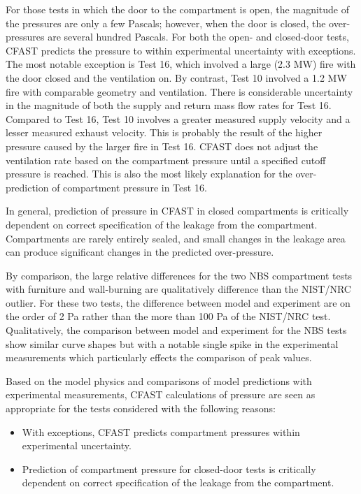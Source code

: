 For those tests in which the door to the compartment is open, the magnitude of the pressures are only a few Pascals; however, when the door is closed, the over-pressures are several hundred Pascals.  For both the open- and closed-door tests, CFAST predicts the pressure to within experimental uncertainty with exceptions.  The most notable exception is Test 16, which involved a large (2.3 MW) fire with the door closed and the ventilation on.  By contrast, Test 10 involved a 1.2 MW fire with comparable geometry and ventilation.  There is considerable uncertainty in the magnitude of both the supply and return mass flow rates for Test 16.  Compared to Test 16, Test 10 involves a greater measured supply velocity and a lesser measured exhaust velocity.  This is probably the result of the higher pressure caused by the larger fire in Test 16.  CFAST does not adjust the ventilation rate based on the compartment pressure until a specified cutoff pressure is reached.  This is also the most likely explanation for the over-prediction of compartment pressure in Test 16.

In general, prediction of pressure in CFAST in closed compartments is critically dependent on correct specification of the leakage from the compartment.  Compartments are rarely entirely sealed, and small changes in the leakage area can produce significant changes in the predicted over-pressure.

By comparison, the large relative differences for the two NBS compartment tests with furniture and wall-burning are qualitatively difference than the NIST/NRC outlier.  For these two tests, the difference between model and experiment are on the order of 2 Pa rather than the more than 100 Pa of the NIST/NRC test.  Qualitatively, the comparison between model and experiment for the NBS tests show similar curve shapes but with a notable single spike in the experimental measurements which particularly effects the comparison of peak values.

Based on the model physics and comparisons of model predictions with experimental measurements, CFAST calculations of pressure are seen as appropriate for the tests considered with the following reasons:

\begin{itemize}
\item With exceptions, CFAST predicts compartment pressures within experimental uncertainty.
\item Prediction of compartment pressure for closed-door tests is critically dependent on correct specification of the leakage from the compartment.
\end{itemize}


